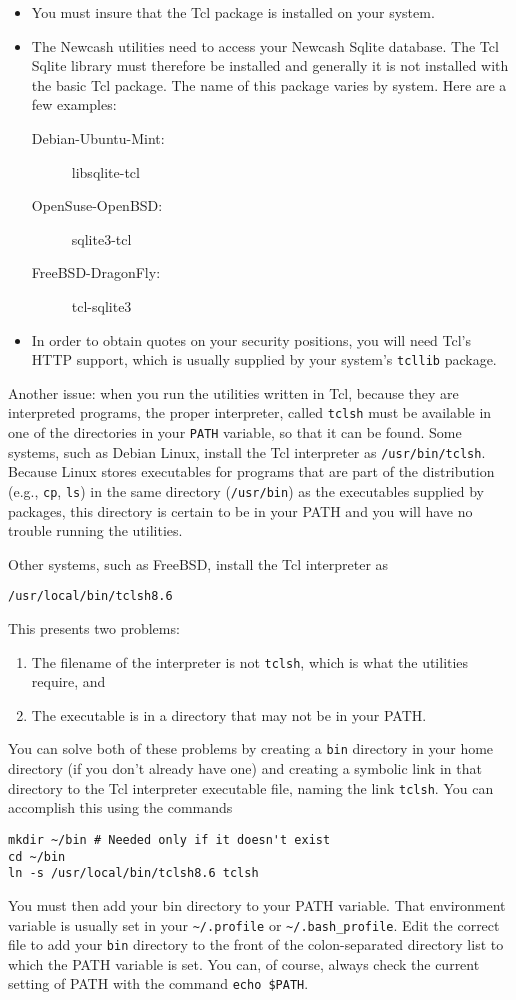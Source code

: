 \documentclass{report}
\begin{document}
\begin{description}
\begin{itemize}
\item You must insure that the Tcl package is installed on your system.
\item The Newcash utilities need to access your Newcash Sqlite database. The Tcl Sqlite library must therefore be installed and generally it is not installed with the basic Tcl package. The name of this package varies by system. Here are a few examples:
\begin{description} 
\item [Debian-Ubuntu-Mint:] libsqlite-tcl
\item [OpenSuse-OpenBSD:] sqlite3-tcl
\item [FreeBSD-DragonFly:] tcl-sqlite3
\end{description} 
\item In order to obtain quotes on your security positions, you will need Tcl's HTTP support, which is usually supplied by your system's \verb|tcllib| package.
\end{itemize}

Another issue: when you run the utilities written in Tcl, because they are interpreted programs, the proper interpreter, called \verb|tclsh| must be available in one of the directories in your \verb|PATH| variable, so that it can be found. Some systems, such as Debian Linux, install the Tcl interpreter as \verb|/usr/bin/tclsh|. Because Linux stores executables for programs that are part of the distribution (e.g., \verb|cp|, \verb|ls|) in the same directory (\verb|/usr/bin|) as the executables supplied by packages, this directory is certain to be in your PATH and you will have no trouble running the utilities. 

Other systems, such as FreeBSD, install the Tcl interpreter as
\begin{verbatim}
/usr/local/bin/tclsh8.6
\end{verbatim}
This presents two problems:
\begin{enumerate}
\item The filename of the interpreter is not \verb|tclsh|, which is what the utilities require, and
\item The executable is in a directory that may not be in your PATH.
\end{enumerate}
You can solve both of these problems by creating a \verb|bin| directory in your home directory (if you don't already have one) and creating a symbolic link in that directory to the Tcl interpreter executable file,  naming the link \verb|tclsh|. You can accomplish this  using the commands
\begin{verbatim}
mkdir ~/bin # Needed only if it doesn't exist
cd ~/bin
ln -s /usr/local/bin/tclsh8.6 tclsh
\end{verbatim}
You must then add your bin directory to your PATH variable. That environment variable is usually set in your  \verb|~/.profile| or \verb|~/.bash_profile|. Edit the correct file to add your  \verb|bin| directory to the front of the colon-separated directory list to which the PATH variable is set. You can, of course, always check the current setting of PATH with the command \verb|echo $PATH|.
\end{description}
\end{document}
